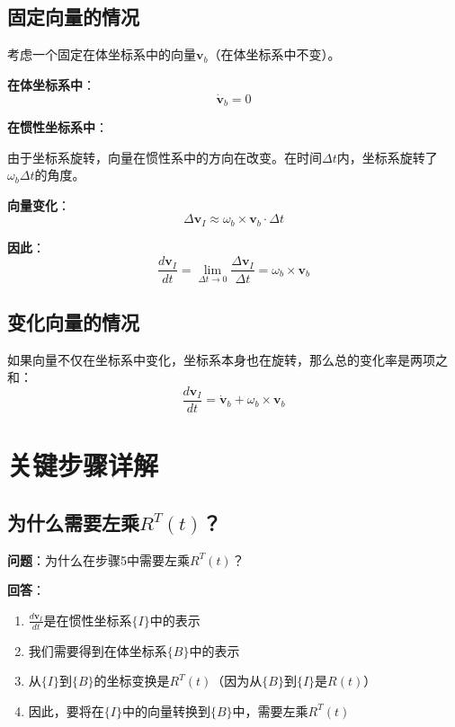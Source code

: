 \documentclass[12pt,a4paper]{article}
\begin{document}
\subsection{固定向量的情况}

考虑一个固定在体坐标系中的向量$\bm{v}_b$（在体坐标系中不变）。

\textbf{在体坐标系中}：
\begin{equation}
\dot{\bm{v}}_b = 0
\end{equation}

\textbf{在惯性坐标系中}：

由于坐标系旋转，向量在惯性系中的方向在改变。在时间$\Delta t$内，坐标系旋转了$\omega_b \Delta t$的角度。

\textbf{向量变化}：
\begin{equation}
\Delta \bm{v}_I \approx \omega_b \times \bm{v}_b \cdot \Delta t
\end{equation}

\textbf{因此}：
\begin{equation}
\frac{d\bm{v}_I}{dt} = \lim_{\Delta t \to 0} \frac{\Delta \bm{v}_I}{\Delta t} = \omega_b \times \bm{v}_b
\end{equation}

\subsection{变化向量的情况}

如果向量不仅在坐标系中变化，坐标系本身也在旋转，那么总的变化率是两项之和：
\begin{equation}
\frac{d\bm{v}_I}{dt} = \dot{\bm{v}}_b + \omega_b \times \bm{v}_b
\end{equation}

\section{关键步骤详解}

\subsection{为什么需要左乘$R^T(t)$？}

\textbf{问题}：为什么在步骤5中需要左乘$R^T(t)$？

\textbf{回答}：

\begin{enumerate}
\item $\frac{d\bm{v}_I}{dt}$是在惯性坐标系$\{I\}$中的表示

\item 我们需要得到在体坐标系$\{B\}$中的表示

\item 从$\{I\}$到$\{B\}$的坐标变换是$R^T(t)$（因为从$\{B\}$到$\{I\}$是$R(t)$）

\item 因此，要将在$\{I\}$中的向量转换到$\{B\}$中，需要左乘$R^T(t)$
\end{enumerate}
\end{document}
